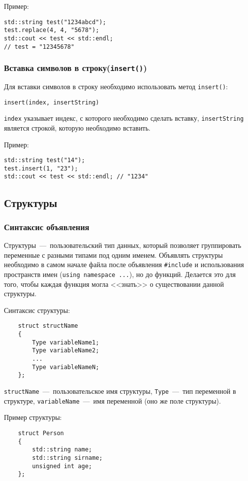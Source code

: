 Пример:
\begin{lstlisting}
std::string test("1234abcd");
test.replace(4, 4, "5678");
std::cout << test << std::endl;
// test = "12345678"
\end{lstlisting}

\subsubsection{Вставка символов в строку(\texttt{insert()})}
Для вставки символов в строку необходимо использовать метод \lstinline|insert()|:

\lstinline|insert(index, insertString)|

\lstinline|index| указывает индекс, с которого необходимо сделать вставку, \lstinline|insertString| является строкой, которую необходимо вставить.

Пример:
\begin{lstlisting}
std::string test("14");
test.insert(1, "23");
std::cout << test << std::endl; // "1234"
\end{lstlisting}

\subsection{Структуры}
\subsubsection{Синтаксис объявления}
Структуры~---~пользовательский тип данных, который позволяет группировать переменные с разными типами под одним именем. Объявлять структуры необходимо в самом начале файла после объявления \lstinline|#include| и использования пространств имен (\lstinline|using namespace ...|), но до функций. Делается это для того, чтобы каждая функция могла <<знать>> о существовании данной структуры.

Синтаксис структуры:
\begin{lstlisting}
    struct structName
    {
        Type variableName1;
        Type variableName2;
        ...
        Type variableNameN;
    };
\end{lstlisting}

\lstinline|structName|~---~пользовательское имя структуры, \lstinline|Type|~---~тип переменной в структуре, \lstinline|variableName|~---~имя переменной (оно же поле структуры).

Пример структуры:
\begin{lstlisting}
    struct Person
    {
        std::string name;
        std::string sirname;
        unsigned int age;
    };
\end{lstlisting}

